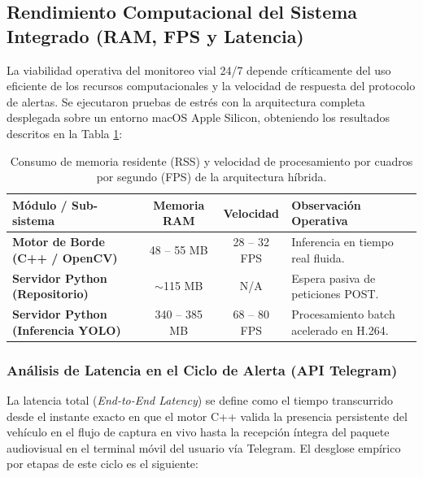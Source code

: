 \documentclass[12pt]{article}
\begin{document}
\subsection{Rendimiento Computacional del Sistema Integrado (RAM, FPS y Latencia)}
La viabilidad operativa del monitoreo vial 24/7 depende críticamente del uso eficiente de los recursos computacionales y la velocidad de respuesta del protocolo de alertas. Se ejecutaron pruebas de estrés con la arquitectura completa desplegada sobre un entorno macOS Apple Silicon, obteniendo los resultados descritos en la Tabla \ref{tab:rendimiento_sistema}:

\begin{table}[H]
    \centering
    \small
    \begin{tabularx}{\linewidth}{|>{\raggedright\arraybackslash}p{4.2cm}|c|c|>{\raggedright\arraybackslash}X|}
        \hline
        \textbf{Módulo / Sub-sistema} & \textbf{Memoria RAM} & \textbf{Velocidad} & \textbf{Observación Operativa} \\
        \hline
        \textbf{Motor de Borde (C++ / OpenCV)} & 48 -- 55 MB & 28 -- 32 FPS & Inferencia en tiempo real fluida. \\
        \hline
        \textbf{Servidor Python (Repositorio)} & $\sim$115 MB & N/A & Espera pasiva de peticiones POST. \\
        \hline
        \textbf{Servidor Python (Inferencia YOLO)} & 340 -- 385 MB & 68 -- 80 FPS & Procesamiento batch acelerado en H.264. \\
        \hline
    \end{tabularx}
    \caption{Consumo de memoria residente (RSS) y velocidad de procesamiento por cuadros por segundo (FPS) de la arquitectura híbrida.}
    \label{tab:rendimiento_sistema}
\end{table}

\subsubsection{Análisis de Latencia en el Ciclo de Alerta (API Telegram)}
La latencia total (\emph{End-to-End Latency}) se define como el tiempo transcurrido desde el instante exacto en que el motor C++ valida la presencia persistente del vehículo en el flujo de captura en vivo hasta la recepción íntegra del paquete audiovisual en el terminal móvil del usuario vía Telegram. El desglose empírico por etapas de este ciclo es el siguiente:
\end{document}
